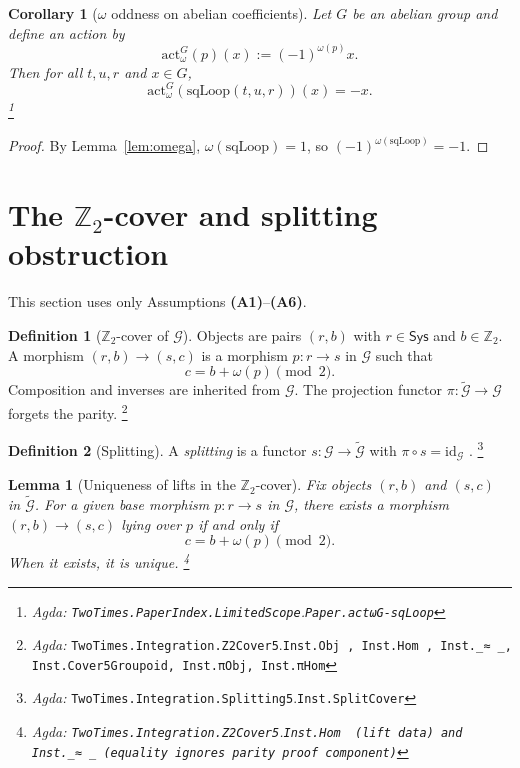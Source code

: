 \documentclass{article}
\newcommand{\Sys}{\mathsf{Sys}}
\newcommand{\Ztwo}{\mathbb{Z}_2}
\newcommand{\Agda}[1]{\texttt{#1}}
\newcommand{\AgdaRef}[2]{\emph{Agda: }\Agda{#1}.\Agda{#2}}
\newcommand{\AgdaNote}[2]{\footnote{\AgdaRef{#1}{#2}}}
\theoremstyle{definition}
\newtheorem{definition}{Definition}[section]
\theoremstyle{plain}
\newtheorem{lemma}{Lemma}[section]
\newtheorem{corollary}{Corollary}[section]
\begin{document}
\begin{corollary}[$\omega$ oddness on abelian coefficients]
\label{cor:omega-odd-abelian}
Let $G$ be an abelian group and define an action by
\[
\mathrm{act}^G_{\omega}(p)(x):=(-1)^{\omega(p)}x.
\]
Then for all $t,u,r$ and $x\in G$,
\[
\mathrm{act}^G_{\omega}(\mathrm{sqLoop}(t,u,r))(x)=-x.
\]
\AgdaNote{TwoTimes.PaperIndex.LimitedScope}{Paper.actωG-sqLoop}
\end{corollary}

\begin{proof}
By Lemma~\ref{lem:omega}, $\omega(\mathrm{sqLoop})=1$, so $(-1)^{\omega(\mathrm{sqLoop})}=-1$.
\end{proof}

\section{The $\Ztwo$-cover and splitting obstruction}
\label{sec:cover}
This section uses only Assumptions \textbf{(A1)}--\textbf{(A6)}.

\begin{definition}[$\Ztwo$-cover of $\mathcal G$]
\label{def:limited-scope-theorem-translation-004}
Objects are pairs $(r,b)$ with $r\in\Sys$ and $b\in\Ztwo$. A morphism
$(r,b)\to(s,c)$ is a morphism $p:r\to s$ in $\mathcal G$ such that
\[c=b+\omega(p)\pmod 2.\]
Composition and inverses are inherited from $\mathcal G$. The projection functor
$\pi:\widetilde{\mathcal G}\to\mathcal G$ forgets the parity.
\AgdaNote{TwoTimes.Integration.Z2Cover5}{Inst.Obj~, Inst.Hom~, Inst._≈~_, Inst.Cover5Groupoid, Inst.πObj, Inst.πHom}
\end{definition}

\begin{definition}[Splitting]
A \emph{splitting} is a functor $s:\mathcal G\to\widetilde{\mathcal G}$ with
$\pi\circ s=\mathrm{id}_{\mathcal G}$ \cite{Brown2006TopologyGroupoids}.
\AgdaNote{TwoTimes.Integration.Splitting5}{Inst.SplitCover}
\end{definition}

\begin{lemma}[Uniqueness of lifts in the $\Ztwo$-cover]
\label{lem:unique-lift}
Fix objects $(r,b)$ and $(s,c)$ in $\widetilde{\mathcal G}$.
For a given base morphism $p:r\to s$ in $\mathcal G$, there exists a morphism
$(r,b)\to(s,c)$ lying over $p$ if and only if
\[
c=b+\omega(p)\pmod 2.
\]
When it exists, it is unique.
\AgdaNote{TwoTimes.Integration.Z2Cover5}{Inst.Hom~ (lift data) and Inst._≈~_ (equality ignores parity proof component)}
\end{lemma}
\end{document}
